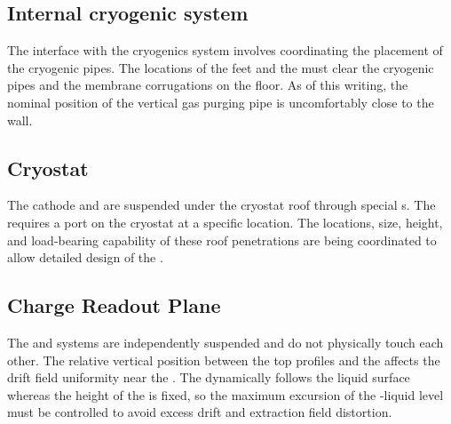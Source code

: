 

\subsection{Internal cryogenic system}
\label{sec:fddp-hv-intfc-to-cryogenic}

The interface with the cryogenics system involves coordinating the placement of the cryogenic pipes. The locations of the  feet and the  must clear the cryogenic pipes and the membrane corrugations on the floor. As of this writing, the nominal position of the vertical gas purging pipe is uncomfortably close to the  wall.


\subsection{Cryostat}
\label{sec:fddp-hv-intfc-to-cryostat}

The cathode and  are suspended under the cryostat roof through special \fdth{}s. The  \fdth requires a port on the cryostat at a specific location.  The locations, size, height, and load-bearing capability of these roof penetrations are being coordinated to allow detailed design of the .




\subsection{Charge Readout Plane}
\label{sec:fddp-hv-intfc-to-crp}

The  and  systems are independently suspended and do not physically touch each other.  The relative vertical position between the top  profiles and the  affects the drift field uniformity near the .  The   dynamically follows the liquid surface whereas the height of the  is fixed, so the maximum excursion of the -liquid level must be controlled to avoid excess drift and extraction field distortion.

